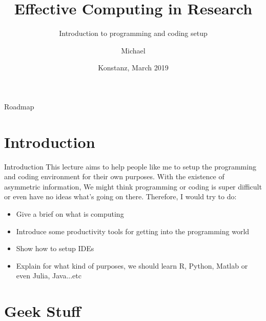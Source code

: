 \documentclass[handout]{beamer} %
\title[]{Effective Computing in Research}
\subtitle{Introduction to programming and coding setup}
\author []%
{Michael \inst{} \inst{}}
\date[] %
{Konstanz, March 2019}
\begin{document}
\begin{frame}[noframenumbering]
  \titlepage
\end{frame}

\begin{frame}{Roadmap}
	\tableofcontents
\end{frame}



\section{Introduction}

\begin{frame}{Introduction}
	This lecture aims to help people like me to setup the programming and coding environment for their own purposes. With the existence of asymmetric information, We might think programming or coding is super difficult or even have no ideas what's going on there. Therefore, I would try to do:
\begin{itemize}
	\item Give a brief on what is computing 
	\item Introduce some productivity tools for getting into the programming world
	\item Show how to setup IDEs
	\item Explain for what kind of purposes, we should learn R, Python, Matlab or even Julia, Java...etc
\end{itemize}
\end{frame}



\section{Geek Stuff}
\end{document}
